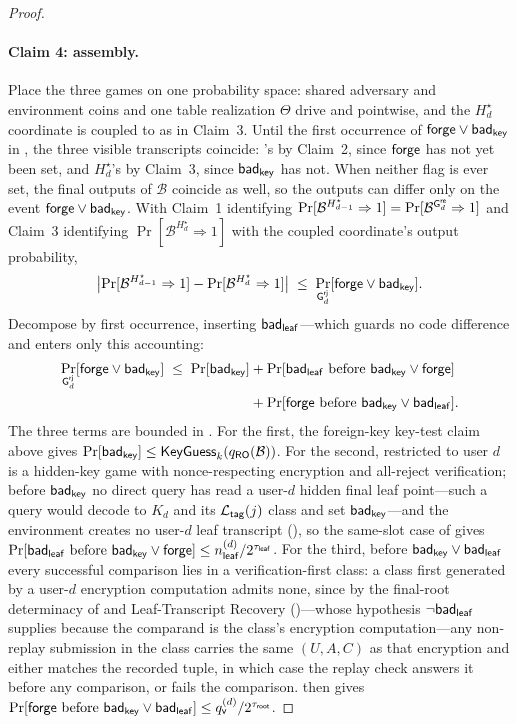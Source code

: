 \begin{proof}
\paragraph{Claim 4: assembly.}
Place the three games on one probability space: shared adversary and
environment coins and one table realization $\Theta$ drive \Greal{} and
\Grej{} pointwise, and the $H_d^\star$ coordinate is coupled to \Grej{}
as in Claim~3. Until the first occurrence of $\mathsf{forge} \vee \mathsf{bad}_{\mathsf{key}}$ in
\Grej{}, the three visible transcripts coincide: \Greal{}'s by Claim~2,
since $\mathsf{forge}$ has not yet been set, and $H_d^\star$'s by Claim~3,
since $\mathsf{bad}_{\mathsf{key}}$ has not. When neither flag is ever set, the final
outputs of $\mathcal{B}$ coincide as well, so the outputs can differ
only on the event $\mathsf{forge} \vee \mathsf{bad}_{\mathsf{key}}$. With Claim~1 identifying
$\Pr[\mathcal{B}^{H_{d-1}^\star} \Rightarrow 1] =
\Pr[\mathcal{B}^{\mathsf{G}^{\mathsf{re}}_{d}} \Rightarrow 1]$ and Claim~3 identifying
$\Pr[\mathcal{B}^{H_d^\star} \Rightarrow 1]$ with the coupled
coordinate's output probability,
\[
  \bigl|\Pr[\mathcal{B}^{H_{d-1}^\star} \Rightarrow 1]
       - \Pr[\mathcal{B}^{H_d^\star} \Rightarrow 1]\bigr|
  \;\leq\;
  \Pr_{\mathsf{G}^{\mathsf{rj}}_{d}}[\mathsf{forge} \vee \mathsf{bad}_{\mathsf{key}}].
\]
Decompose by first occurrence, inserting $\mathsf{bad}_{\mathsf{leaf}}$---which guards no
code difference and enters only this accounting:
\[
\begin{aligned}
  \Pr_{\mathsf{G}^{\mathsf{rj}}_{d}}[\mathsf{forge} \vee \mathsf{bad}_{\mathsf{key}}]
  \;\leq\;
  \Pr[\mathsf{bad}_{\mathsf{key}}]
  &+ \Pr[\mathsf{bad}_{\mathsf{leaf}} \text{ before } \mathsf{bad}_{\mathsf{key}} \vee \mathsf{forge}] \\
  &+ \Pr[\mathsf{forge} \text{ before } \mathsf{bad}_{\mathsf{key}} \vee \mathsf{bad}_{\mathsf{leaf}}].
\end{aligned}
\]
The three terms are bounded in \Grej{}. For the first, the foreign-key
key-test claim above gives
$\Pr[\mathsf{bad}_{\mathsf{key}}] \leq \mathsf{KeyGuess}_k(q_{\mathsf{RO}}(\mathcal{B}))$. For the second,
\Grej{} restricted to user $d$ is a hidden-key game with
nonce-respecting encryption and all-reject verification; before
$\mathsf{bad}_{\mathsf{key}}$ no direct query has read a user-$d$ hidden final leaf
point---such a query would decode to $K_d$ and its $\mathcal{L}_{\mathsf{tag}}(j)$ class and
set $\mathsf{bad}_{\mathsf{key}}$---and the environment creates no user-$d$ leaf transcript
(), so the same-slot case of
 gives
$\Pr[\mathsf{bad}_{\mathsf{leaf}} \text{ before } \mathsf{bad}_{\mathsf{key}} \vee \mathsf{forge}]
\leq n_{\mathsf{leaf}}^{(d)}/2^{\tau_{\mathsf{leaf}}}$. For the third, before
$\mathsf{bad}_{\mathsf{key}} \vee \mathsf{bad}_{\mathsf{leaf}}$ every successful comparison lies in a
verification-first class: a class first generated by a user-$d$
encryption computation admits none, since by the final-root determinacy
of  and Leaf-Transcript Recovery
()---whose hypothesis $\neg\mathsf{bad}_{\mathsf{leaf}}$ supplies
because the comparand is the class's encryption computation---any
non-replay submission in the class carries the same $(U,A,C)$ as that
encryption and either matches the recorded tuple, in which case the
replay check answers it before any comparison, or fails the comparison.
 then gives
$\Pr[\mathsf{forge} \text{ before } \mathsf{bad}_{\mathsf{key}} \vee \mathsf{bad}_{\mathsf{leaf}}]
\leq q_{\mathsf{v}}^{(d)}/2^{\tau_{\mathsf{root}}}$.


\end{proof}
